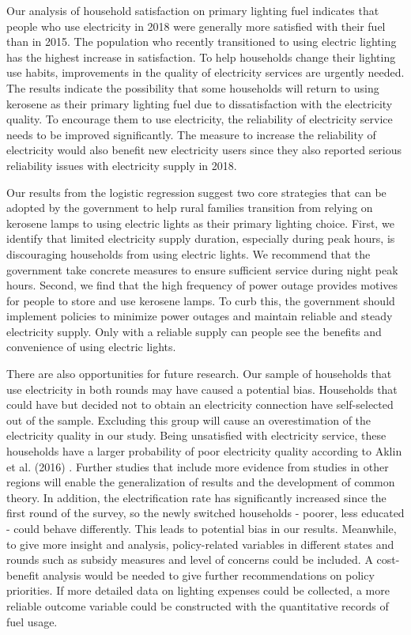 \documentclass[11pt,english]{article}
\theoremstyle{plain} \newtheorem{claim}{Claim}
\theoremstyle{plain} \newtheorem{prop}{Proposition}
\theoremstyle{plain} \newtheorem{hypo}{Hypothesis}
\begin{document}
Our analysis of household satisfaction on primary lighting fuel indicates that people who use electricity in 2018 were generally more satisfied with their fuel than in 2015. The population who recently transitioned to using electric lighting has the highest increase in satisfaction. To help households change their lighting use habits, improvements in the quality of electricity services are urgently needed. The results indicate the possibility that some households will return to using kerosene as their primary lighting fuel due to dissatisfaction with the electricity quality. To encourage them to use electricity, the reliability of electricity service needs to be improved significantly. The measure to increase the reliability of electricity would also benefit new electricity users since they also reported serious reliability issues with electricity supply in 2018.


Our results from the logistic regression suggest two core strategies that can be adopted by the government to help rural families transition from relying on kerosene lamps to using electric lights as their primary lighting choice. First, we identify that limited electricity supply duration, especially during peak hours, is discouraging households from using electric lights. We recommend that the government take concrete measures to ensure sufficient service during night peak hours. Second, we find that the high frequency of power outage provides motives for people to store and use kerosene lamps. To curb this, the government should implement policies to minimize power outages and maintain reliable and steady electricity supply. Only with a reliable supply can people see the benefits and convenience of using electric lights.

There are also opportunities for future research. Our sample of households that use electricity in both rounds may have caused a potential bias. Households that could have but decided not to obtain an electricity connection have self-selected out of the sample. Excluding this group will cause an overestimation of the electricity quality in our study. Being unsatisfied with electricity service, these households have a larger probability of poor electricity quality according to Aklin et al. (2016) \citep{Aklinetal2016}. Further studies that include more evidence from studies in other regions will enable the generalization of results and the development of common theory. In addition, the electrification rate has significantly increased since the first round of the survey, so the newly switched households - poorer, less educated - could behave differently. This leads to potential bias in our results. Meanwhile, to give more insight and analysis, policy-related variables in different states and rounds such as subsidy measures and level of concerns could be included. A cost-benefit analysis would be needed to give further recommendations on policy priorities. If more detailed data on lighting expenses could be collected, a more reliable outcome variable could be constructed with the quantitative records of fuel usage.
\end{document}
